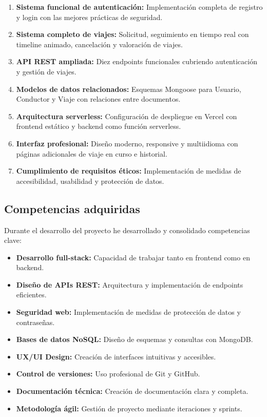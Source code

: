 \documentclass[12pt,a4paper]{article}
\begin{document}
\begin{enumerate}
    \item \textbf{Sistema funcional de autenticación:} Implementación completa de registro y login con las mejores prácticas de seguridad.
    
    \item \textbf{Sistema completo de viajes:} Solicitud, seguimiento en tiempo real con timeline animado, cancelación y valoración de viajes.
    
    \item \textbf{API REST ampliada:} Diez endpoints funcionales cubriendo autenticación y gestión de viajes.
    
    \item \textbf{Modelos de datos relacionados:} Esquemas Mongoose para Usuario, Conductor y Viaje con relaciones entre documentos.
    
    \item \textbf{Arquitectura serverless:} Configuración de despliegue en Vercel con frontend estático y backend como función serverless.
    
    \item \textbf{Interfaz profesional:} Diseño moderno, responsive y multiidioma con páginas adicionales de viaje en curso e historial.
    
    \item \textbf{Cumplimiento de requisitos éticos:} Implementación de medidas de accesibilidad, usabilidad y protección de datos.
\end{enumerate}

\subsection{Competencias adquiridas}

Durante el desarrollo del proyecto he desarrollado y consolidado competencias clave:

\begin{itemize}
    \item \textbf{Desarrollo full-stack:} Capacidad de trabajar tanto en frontend como en backend.
    \item \textbf{Diseño de APIs REST:} Arquitectura y implementación de endpoints eficientes.
    \item \textbf{Seguridad web:} Implementación de medidas de protección de datos y contraseñas.
    \item \textbf{Bases de datos NoSQL:} Diseño de esquemas y consultas con MongoDB.
    \item \textbf{UX/UI Design:} Creación de interfaces intuitivas y accesibles.
    \item \textbf{Control de versiones:} Uso profesional de Git y GitHub.
    \item \textbf{Documentación técnica:} Creación de documentación clara y completa.
    \item \textbf{Metodología ágil:} Gestión de proyecto mediante iteraciones y sprints.
\end{itemize}
\end{document}
